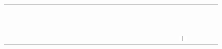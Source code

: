 \documentclass[10pt]{article}
\begin{document}
\begin{center}
\begin{tabular}{|c|c|c|c|c|c|c|c|c|c|c|c|c|c|c|c|c|c|c|c|c|c|c|c|c|c|c|c|c|c|}
\hline
 &  &  &  &  &  &  &  &  &  &  &  &  &  &  &  &  &  &  &  &  &  &  &  &  &  &  &  &  &  \\
\hline
 &  &  &  &  &  &  &  &  &  &  &  &  &  &  &  &  &  &  &  &  &  &  &  &  &  &  &  &  &  \\
\hline
 &  &  &  &  &  &  &  &  &  &  &  &  &  &  &  &  &  &  &  &  &  &  &  &  &  &  &  &  &  \\
\hline
 &  &  &  &  &  &  &  &  &  &  &  &  &  &  &  &  &  &  &  &  &  &  &  &  &  &  &  &  &  \\
\hline
 &  &  &  &  &  &  &  &  &  &  &  &  &  &  &  &  &  &  &  &  &  &  &  &  &  &  &  &  &  \\
\hline
 &  &  &  &  &  &  &  &  &  &  &  &  &  &  &  &  &  &  &  &  &  &  &  &  &  &  &  &  &  \\
\hline
 &  &  &  &  &  &  &  &  &  &  &  &  &  &  &  &  &  &  &  &  &  &  &  &  &  &  &  &  &  \\
\hline
 &  &  &  &  &  &  &  &  &  &  &  &  &  &  &  &  &  &  &  &  &  &  &  &  &  &  &  &  &  \\
\hline
 &  &  &  &  &  &  &  &  &  &  &  &  &  &  &  &  &  &  &  &  &  &  &  &  &  &  &  &  &  \\
\hline
 &  &  &  &  &  &  &  &  &  &  &  &  &  &  &  &  &  &  &  &  &  &  &  &  &  &  &  &  &  \\
\hline
 &  &  &  &  &  &  &  &  &  &  &  &  &  &  &  &  &  &  &  &  &  &  &  &  &  &  &  &  &  \\
\hline
 &  &  &  &  &  &  &  &  &  &  &  &  &  &  &  &  &  &  &  &  &  &  &  &  &  &  &  &  &  \\
\hline
 &  &  &  &  &  &  &  &  &  &  &  &  &  &  &  &  &  &  &  &  &  &  &  &  & \includegraphics[max width=\textwidth]{2024_11_21_6438f6dbc3784fe6d1deg-08(7)}

\end{tabular}
\end{center}
\end{document}
